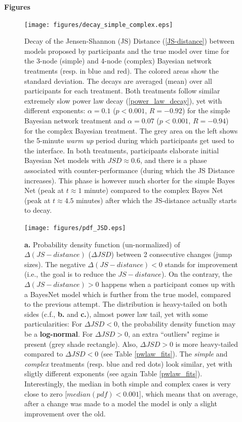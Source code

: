 \begin{center}
{\Large {\bf Figures}}
\vspace{1.5cm}
\end{center}

\begin{figure}[h!]
\begin{center}
\texttt{[image: figures/decay\_simple\_complex.eps]}
\caption{\footnotesize Decay of the Jensen-Shannon (JS) Distance (\ref{JS-distance}) between models proposed by participants and the true model over time for the 3-node (simple) and 4-node (complex) Bayesian network treatments (resp. in blue and red). The colored areas show the standard deviation. The decays are averaged (mean) over all participants for each treatment. Both treatments follow similar extremely slow power law decay (\ref{power_law_decay}), yet with different exponents: $\alpha = 0.1$ ($p < 0.001$, $R = -0.92$) for the simple Bayesian network treatment and $\alpha = 0.07$ ($p < 0.001$, $R = -0.94$) for the complex Bayesian treatment. The grey area on the left shows the 5-minute {\it warm up} period during which participants get used to the interface. In both treatments, participants elaborate initial Bayesian Net models with $JSD \approx 0.6$, and there is a phase associated with counter-performance (during which the JS Distance increases). This phase is however much shorter for the simple Bayes Net (peak at $t \approx1$ minute) compared to the complex Bayes Net (peak at $t \approx 4.5$ minutes) after which the JS-distance actually starts to decay.}
\label{fig:decay}
\end{center}
\end{figure}

\begin{figure}[h!]
\begin{center}
\texttt{[image: figures/pdf\_JSD.eps]}
\caption{{\bf a.} Probability density function (un-normalized) of $\Delta(JS-distance)$ ($\Delta JSD$) between 2 consecutive changes (jump sizes). The negative $\Delta(JS-distance) < 0$ stands for improvement (i.e., the goal is to reduce the $JS-distance$). On the contrary, the $\Delta(JS-distance) >  0$ happens when a participant comes up with a BayesNet model which is further from the true model, compared to the previous attempt. The distribution is heavy-tailed on both sides (c.f., {\bf b.} and {\bf c.}), almost power law tail, yet with some particularities: For $\Delta JSD < 0$, the probability density function may be a {\bf log-normal}. For $\Delta JSD > 0$, an extra ``outliers" regime is present (grey shade rectangle). Also, $\Delta JSD > 0$ is more heavy-tailed compared to $\Delta JSD < 0$ (see Table \ref{pwlaw_fits}). The {\it simple} and {\it complex} treatments (resp. blue and red dots) look similar, yet with sligtly different exponents (see again Table \ref{pwlaw_fits}). Interestingly, the median in both simple and complex cases is very close to zero [$median(pdf) < 0.001$], which means that on average, after a change was made to a model the model is only a slight improvement over the old.}
\label{fig:jump_sizes}
\end{center}
\end{figure}


